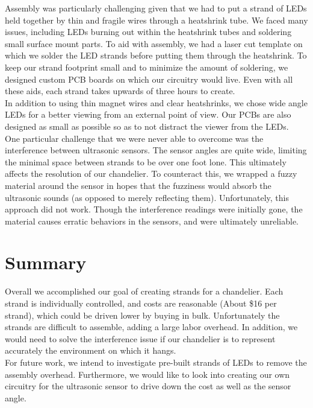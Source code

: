 \documentclass[10pt,titlepage]{article}
\begin{document}
  Assembly was particularly challenging given that we had to put a strand of LEDs held together by thin and fragile wires through a heatshrink tube. We faced many issues, including LEDs burning out within the heatshrink tubes and soldering small surface mount parts. To aid with assembly, we had a laser cut template on which we solder the LED strands before putting them through the heatshrink. To keep our strand footprint small and to minimize the amount of soldering, we designed custom PCB boards on which our circuitry would live. Even with all these aids, each strand takes upwards of three hours to create.\\
  
  In addition to using thin magnet wires and clear heatshrinks, we chose wide angle LEDs for a better viewing from an external point of view. Our PCBs are also designed as small as possible so as to not distract the viewer from the LEDs. \\

  One particular challenge that we were never able to overcome was the interference between ultrasonic sensors. The sensor angles are quite wide, limiting the minimal space between strands to be over one foot lone. This ultimately affects the resolution of our chandelier. To counteract this, we wrapped a fuzzy material around the sensor in hopes that the fuzziness would absorb the ultrasonic sounds (as opposed to merely reflecting them). Unfortunately, this approach did not work. Though the interference readings were initially gone, the material causes erratic behaviors in the sensors, and were ultimately unreliable. \\

  \section*{Summary}
  Overall we accomplished our goal of creating strands for a chandelier. Each strand is individually controlled, and costs are reasonable (About \$16 per strand), which could be driven lower by buying in bulk. Unfortunately the strands are difficult to assemble, adding a large labor overhead. In addition, we would need to solve the interference issue if our chandelier is to represent accurately the environment on which it hangs. \\

  For future work, we intend to investigate pre-built strands of LEDs to remove the assembly overhead. Furthermore, we would like to look into creating our own circuitry for the ultrasonic sensor to drive down the cost as well as the sensor angle. \\
\end{document}
